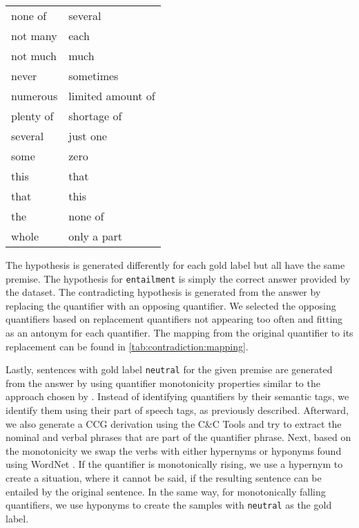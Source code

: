\begin{table}[ht!]
\begin{tabular}{l | l}
        none of &  several \\
        not many &  each \\
        not much &  much \\
        never &  sometimes \\
        numerous &  limited amount of \\
        plenty of &  shortage of \\
        several &  just one \\
        some &  zero \\
        this &  that \\
        that &  this \\
        the &  none of \\
        whole &  only a part
    \end{tabular}
    \label{tab:contradiction:mapping}
\end{table}

The hypothesis is generated differently for each gold label but all have the same premise. The hypothesis for \texttt{entailment} is simply the correct answer provided by the dataset. The contradicting hypothesis is generated from the answer by replacing the quantifier with an opposing quantifier. We selected the opposing quantifiers based on replacement quantifiers not appearing too often and fitting as an antonym for each quantifier. The mapping from the original quantifier to its replacement can be found in \autoref{tab:contradiction:mapping}.

Lastly, sentences with gold label \texttt{neutral} for the given premise are generated from the answer by using quantifier monotonicity properties similar to the approach chosen by \citet{yanaka-etal-2019-help}. Instead of identifying quantifiers by their semantic tags, we identify them using their part of speech tags, as previously described. Afterward, we also generate a \ac{CCG} derivation using the C\&C Tools \cite{curran-etal-2007-linguistically} and try to extract the nominal and verbal phrases that are part of the quantifier phrase. Next, based on the monotonicity we swap the verbs with either hypernyms or hyponyms found using WordNet \cite{miller-1994-wordnet}. If the quantifier is monotonically rising, we use a hypernym to create a situation, where it cannot be said, if the resulting sentence can be entailed by the original sentence. In the same way, for monotonically falling quantifiers, we use hyponyms to create the samples with \texttt{neutral} as the gold label.

